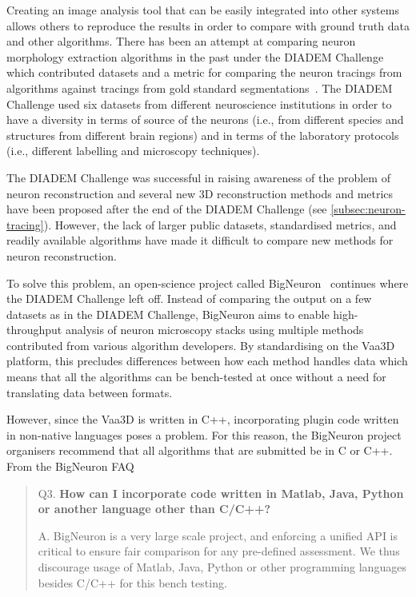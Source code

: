 Creating an image analysis tool that can be easily integrated into
other systems allows others to reproduce the results in order to
compare with ground truth data and other algorithms. There
has been an attempt at comparing neuron morphology extraction
algorithms in the past under the \acrshort{DIADEM} Challenge which
contributed datasets and a metric for comparing the neuron
tracings from algorithms against tracings from gold standard
segmentations~\autocite{DIADEM&Beyond:Liu:2011,DIADEM-dataset:Brown:2011,DIADEM-metric-Gillette2011}.
The DIADEM Challenge used six datasets from different neuroscience
institutions in order to have a diversity in terms of source of
the neurons (i.e., from different species and structures from
different brain regions) and in terms of the laboratory protocols
(i.e., different labelling and microscopy techniques).

The DIADEM Challenge was successful in raising awareness of the
problem of neuron reconstruction and several new 3D reconstruction
methods and metrics have been proposed after the end of the DIADEM
Challenge (see \cref{subsec:neuron-tracing}).  However, the
lack of larger public datasets, standardised metrics, and readily
available algorithms have made it difficult to compare new methods
for neuron reconstruction.

To solve this problem, an open-science project called
BigNeuron~\autocite{BigNeuron:Peng:2015,DIADEM2BigNeuron:Peng:2015}
continues where the DIADEM Challenge left off. Instead of
comparing the output on a few datasets as in the DIADEM Challenge,
BigNeuron aims to enable high-throughput analysis of neuron
microscopy stacks using multiple methods contributed from various
algorithm developers. By standardising on the Vaa3D platform, this
precludes differences between how each method handles data which
means that all the algorithms can be bench-tested at once without
a need for translating data between formats.

However, since the Vaa3D is written in C++, incorporating plugin
code written in non-native languages poses a problem. For this
reason, the BigNeuron project organisers recommend that all
algorithms that are submitted be in C or C++. From the BigNeuron
FAQ~\autocite{BigNeuron:FAQ:2015}\\
\parbox{\textwidth}{
\begin{quote}
	\begin{fancyquote}
		{Q3. \bfseries How can I incorporate code written in Matlab, Java, Python or another language other than C/C++?}

		A. BigNeuron is a very large scale project, and enforcing a
		unified API is critical to ensure fair comparison for any pre-defined
		assessment. We thus discourage usage of Matlab, Java, Python or other
		programming languages besides C/C++ for this bench
		testing.
	\end{fancyquote}
\end{quote}
}

